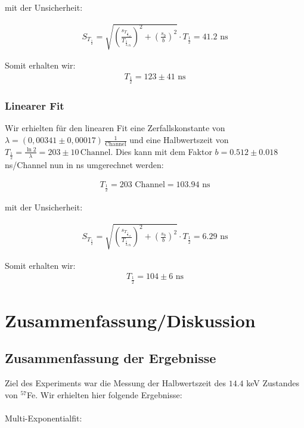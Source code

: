 \documentclass[12pt]{article}
\begin{document}
mit der Unsicherheit:

\begin{align*}
S_{T_{\frac12}} = \sqrt{\left(\frac{s_{T_{{\frac12}_{ch}}}}{T_{{\frac12}_{ch}}}\right)^2+\left(\frac{s_b}{b}\right)^2} \cdot T_{\frac12} = 41.2 \text{ ns}
\end{align*}

Somit erhalten wir:
\begin{align*}
T_{\frac12} = 123 \pm 41 \text{ ns}
\end{align*}

\subsubsection{Linearer Fit}

Wir erhielten für den linearen Fit eine Zerfallskonstante von  $\lambda=(0,00341\pm0,00017)\, \frac1{\text{Channel}}$ und eine Halbwertszeit von $T_{\frac12}=\frac{\ln2}{\lambda}=203\pm10\,\text{Channel}$. Dies kann mit dem Faktor $b=0.512\pm0.018$ ns/Channel nun in ns umgerechnet werden:

\begin{align*}
T_{\frac12} = 203\text{ Channel} = 103.94 \text{ ns}
\end{align*}

mit der Unsicherheit:

\begin{align*}
S_{T_{\frac12}} = \sqrt{\left(\frac{s_{T_{{\frac12}_{ch}}}}{T_{{\frac12}_{ch}}}\right)^2+\left(\frac{s_b}{b}\right)^2} \cdot T_{\frac12} = 6.29 \text{ ns}
\end{align*}

Somit erhalten wir:
\begin{align*}
T_{\frac12} = 104 \pm 6 \text{ ns}
\end{align*}

\newpage
\section{Zusammenfassung/Diskussion}

\subsection{Zusammenfassung der Ergebnisse}

Ziel des Experiments war die Messung der Halbwertszeit des $14.4$ keV Zustandes von $^{57}$Fe. Wir erhielten hier folgende Ergebnisse:\\
\\
Multi-Exponentialfit: 
\end{document}
